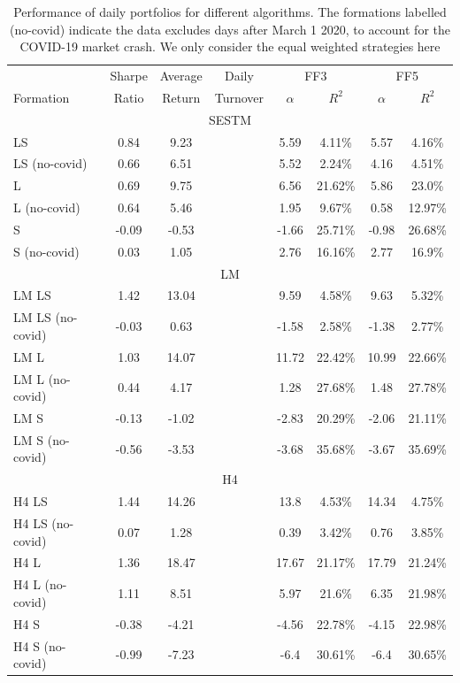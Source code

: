 \begin{table}[!t]
\begin{center}
\begin{tabular}{lccccccc}
      \toprule
      & Sharpe &  Average & Daily & \multicolumn{2}{c}{FF3} & \multicolumn{2}{c}{FF5} \\
      \cmidrule(lr){5-6}
      \cmidrule(lr){7-8}
      Formation & Ratio & Return & Turnover & $\alpha$ & $R^2$ & $\alpha$ & $R^2$ \\
      \midrule
      \multicolumn{8}{c}{SESTM} \\
LS & 0.84 & 9.23 & & 5.59 & 4.11\% & 5.57 & 4.16\% \\
LS (no-covid) & 0.66 & 6.51 & & 5.52 & 2.24\% & 4.16 & 4.51\% \\
L & 0.69 & 9.75 & & 6.56 & 21.62\% & 5.86 & 23.0\% \\
L (no-covid) & 0.64 & 5.46 & & 1.95 & 9.67\% & 0.58 & 12.97\% \\
S & -0.09 & -0.53 & & -1.66 & 25.71\% & -0.98 & 26.68\% \\
S (no-covid) & 0.03 & 1.05 & & 2.76 & 16.16\% & 2.77 & 16.9\% \\
   \multicolumn{8}{c}{LM} \\
LM LS & 1.42 & 13.04 & & 9.59 & 4.58\% & 9.63 & 5.32\% \\
LM LS (no-covid) & -0.03 & 0.63 & & -1.58 & 2.58\% & -1.38 & 2.77\% \\
LM L & 1.03 & 14.07 & & 11.72 & 22.42\% & 10.99 & 22.66\% \\
LM L (no-covid) & 0.44 & 4.17 & & 1.28 & 27.68\% & 1.48 & 27.78\% \\
LM S & -0.13 & -1.02 & & -2.83 & 20.29\% & -2.06 & 21.11\% \\
LM S (no-covid) & -0.56 & -3.53 & & -3.68 & 35.68\% & -3.67 & 35.69\% \\
   \multicolumn{8}{c}{H4} \\
H4 LS & 1.44 & 14.26 & & 13.8 & 4.53\% & 14.34 & 4.75\% \\
H4 LS (no-covid) & 0.07 & 1.28 & & 0.39 & 3.42\% & 0.76 & 3.85\% \\
H4 L & 1.36 & 18.47 & & 17.67 & 21.17\% & 17.79 & 21.24\% \\
H4 L (no-covid) & 1.11 & 8.51 & & 5.97 & 21.6\% & 6.35 & 21.98\% \\
H4 S & -0.38 & -4.21 & & -4.56 & 22.78\% & -4.15 & 22.98\% \\
H4 S (no-covid) & -0.99 & -7.23 & & -6.4 & 30.61\% & -6.4 & 30.65\% \\
      \bottomrule

\end{tabular}
\caption[Daily portfolio comparison]{Performance of daily portfolios for different algorithms. The formations labelled (no-covid) indicate the data excludes days after March 1 2020, to account for the COVID-19 market crash. We only consider the equal weighted strategies here}
\label{portfolio-performance-comparison}
\end{center}
\end{table}

